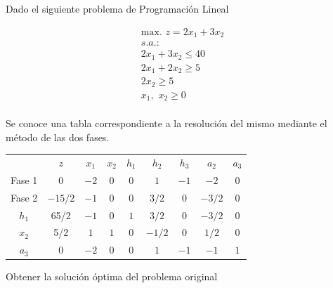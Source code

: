 Dado el siguiente problema de Programación Lineal

\begin{equation}
\begin{split}
\mbox{max. } z = 2x_1 + 3x_2\\
s.a.:\\
2x_1 + 3x_2 \leq 40\\
2x_1 + 2x_2 \geq 5\\
2x_2 \geq 5\\
x_1,\,\,x_2\geq 0\\
\end{split}
\end{equation}

Se conoce una tabla correspondiente a la resolución del mismo mediante el método de las dos fases.

\begin{center}
\begin{tabular}{c|c|ccccccc|}
 & $z$ & $x_1$ & $x_2$ & $h_1$ & $h_2$ & $h_3$ & $a_2$ & $a_3$\\ 
Fase 1 & $0$ & $-2$ & $0$ & $0$ & $1$ & $-1$ & $-2$ & $0$ \\
Fase 2 & $-15/2$ & $-1$ & $0$ & $0$ & $3/2$ & $0$ & $-3/2$ & $0$ \\
\hline
$h_1$ & 65/2  & $-1$ & $0$ & $1$ & $3/2$ & $0$ & $-3/2$ & $0$\\
$x_2$ & 5/2  & $1$ & $1$ & $0$ & $-1/2$ & $0$ & $1/2$ & $0$\\
$a_3$ & 0  & $-2$ & $0$ & $0$ & $1$ & $-1$ & $-1$ & $1$\\
\hline
\end{tabular}
\end{center}

Obtener la solución óptima del problema original
